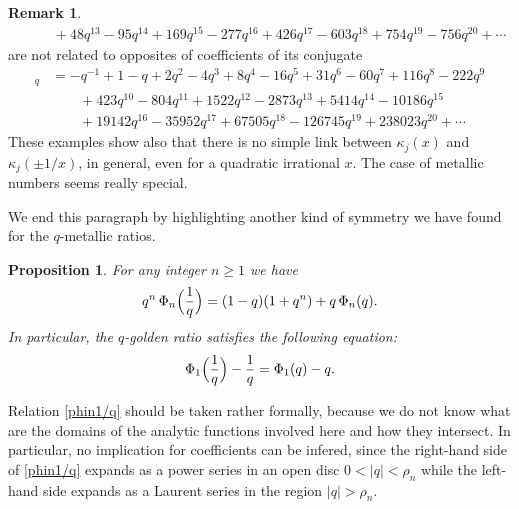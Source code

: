\documentclass[11pt,reqno]{amsart}
\theoremstyle{plain}
\newtheorem{proposition}[lemme]{Proposition}
\theoremstyle{definition}
\newtheorem{remarque}[lemme]{Remark}
\numberwithin{figure}{section}
\numberwithin{table}{section}
\numberwithin{equation}{section}
\newcommand\ka{\kappa}
\let\fr=\frac
\begin{document}
\begin{remarque}
\begin{align*}
&\qquad + 48q^{13} -95q^{14} + 169q^{15} -277q^{16} + 426q^{17} -603q^{18} + 754q^{19} -756q^{20} + \cdots
\end{align*} 
are not related to  opposites of coefficients of its conjugate 
\begin{align*}
[-1/\sqrt{7}]_q
&=-q^{-1} + 1 -q + 2q^2 -4q^3 + 8q^4 -16q^5 + 31q^6 -60q^7 + 116q^8 -222q^9\\
&\qquad + 423q^{10} -804q^{11} + 1522q^{12} -2873q^{13} + 5414q^{14} -10186q^{15}\\
&\qquad + 19142q^{16} -35952q^{17} + 67505q^{18} -126745q^{19} + 238023q^{20}  +\cdots
\end{align*}
These examples show also that there is no simple link between $\ka_j(x)$ and $\ka_j(\pm 1/x)$, in general, even for a quadratic irrational $x$. The case of metallic numbers seems really special.
\end{remarque}

We end this paragraph by highlighting another kind of symmetry we have found for the $q$-metallic ratios.  

\begin{proposition} For any integer $n≥1$ we have
\begin{equation}\label{phin1/q}
q^n\,\Phi_n\Bigl(\fr 1{q}\Bigr)=(1-q)(1+q^n)+q\,\Phi_n(q).
\end{equation}
In particular, the $q$-golden ratio satisfies the following equation:
\begin{equation*}
\Phi_1\Bigl(\fr 1{q}\Bigr)-\fr 1{q}=\Phi_1(q)-q.
\end{equation*}
\end{proposition}

Relation \eqref{phin1/q} should be taken rather formally, because we do not know what are the domains of the analytic functions involved here and how they intersect. In particular, no implication for coefficients can be infered, since the right-hand side of \eqref{phin1/q} expands as a power series in an open disc $0<|q|<\rho_n$ while the left-hand side expands as a Laurent series in the region $|q|>\rho_n$.
\end{document}
